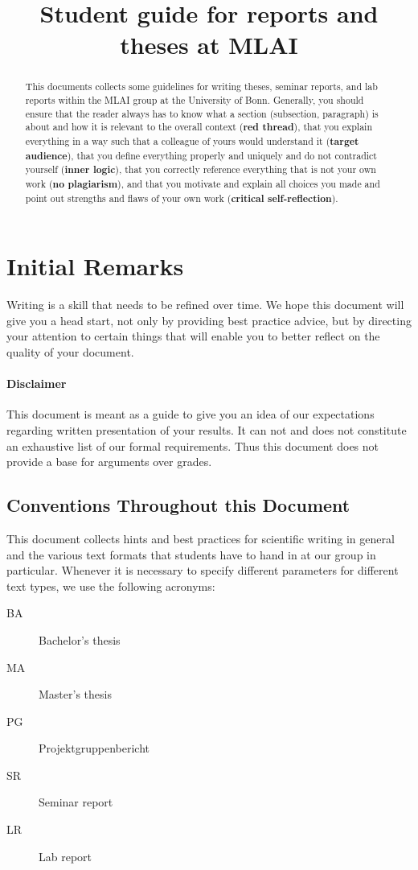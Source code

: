 \documentclass[twocolumn]{mlai-guide}
\date{} %
\title{Student guide for reports and theses at MLAI}
\begin{document}
\maketitle

\begin{abstract}
	This documents collects some guidelines for writing theses, seminar reports, and lab reports within the MLAI group at the University of Bonn.
	Generally, you should ensure that
	the reader always has to know what a section (subsection, paragraph) is about and how it is relevant to the overall context (\textbf{red thread}), that you explain everything in a way such that a colleague of yours would understand it (\textbf{target audience}), that you define everything properly and uniquely and do not contradict yourself (\textbf{inner logic}), that you correctly reference everything that is not your own work (\textbf{no plagiarism}), and that you motivate and explain all choices you made and point out strengths and flaws of your own work (\textbf{critical self-reflection}).

\end{abstract}

\tableofcontents


\section{Initial Remarks}
Writing is a skill that needs to be refined over time. We hope this document will give you a head start, not only by providing best practice advice, but by directing your attention to certain things that will enable you to better reflect on the quality of your document.

\paragraph{Disclaimer} This document is meant as a guide to give you an idea of our expectations regarding written presentation of your results. It can not and does not constitute an exhaustive list of our formal requirements. Thus this document does not provide a base for arguments over grades.

\subsection{Conventions Throughout this Document}
This document collects hints and best practices for scientific writing in general and the various text formats that students have to hand in at our group in particular.
Whenever it is necessary to specify different parameters for different text types, we use the following acronyms:
\begin{description}
\item[BA] Bachelor's thesis
\item[MA] Master's thesis
\item[PG] Projektgruppenbericht
\item[SR] Seminar report
\item[LR] Lab report
\end{description}
\end{document}

